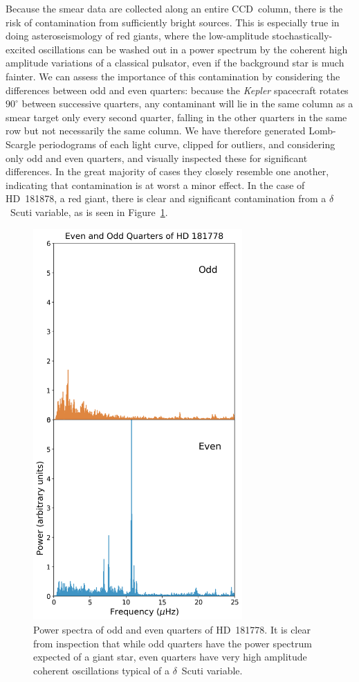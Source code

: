 \documentclass[a4paper,fleqn,usenatbib]{mnras}
\newcommand{\kepler}{\emph{Kepler}\xspace}
\begin{document}
Because the smear data are collected along an entire CCD~column, there is the risk of contamination from sufficiently bright sources. This is especially true in doing asteroseismology of red giants, where the low-amplitude stochastically-excited oscillations can be washed out in a power spectrum by the coherent high amplitude variations of a classical pulsator, even if the background star is much fainter. We can assess the importance of this contamination by considering the differences between odd and even quarters: because the \kepler spacecraft rotates $90^{\circ}$ between successive quarters, any contaminant will lie in the same column as a smear target only every second quarter, falling in the other quarters in the same row but not necessarily the same column. We have therefore generated Lomb-Scargle periodograms \citep{lomb,scargle} of each light curve, clipped for outliers, and considering only odd and even quarters, and visually inspected these for significant differences. In the great majority of cases they closely resemble one another, indicating that contamination is at worst a minor effect. In the case of HD~181878, a red giant, there is clear and significant contamination from a $\delta$~Scuti variable, as is seen in Figure~\ref{contamination}. 


\begin{figure}
\noindent\includegraphics[width=8cm,keepaspectratio]{contam_HD_181778.png}

\caption{\label{contamination}
Power spectra of odd and even quarters of HD~181778. It is clear from inspection that while odd quarters have the power spectrum expected of a giant star, even quarters have very high amplitude coherent oscillations typical of a $\delta$~Scuti variable.}
\end{figure}
\end{document}
